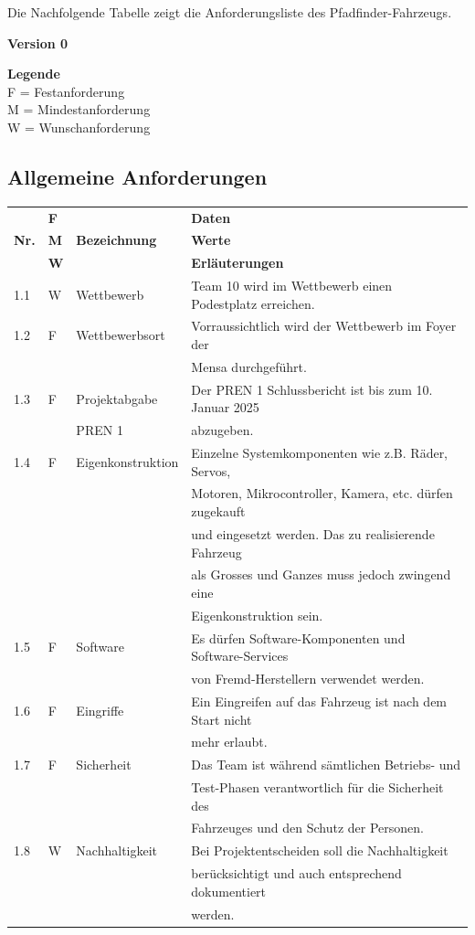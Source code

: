 \documentclass[../main.tex]{subfiles}
\begin{document}
Die Nachfolgende Tabelle zeigt die Anforderungsliste des Pfadfinder-Fahrzeugs.

\textbf{Version 0}

\textbf{Legende} \\ F = Festanforderung \\ M = Mindestanforderung \\ W = Wunschanforderung

\subsection{Allgemeine Anforderungen}
\begin{tabular}{|l|l|l|l|}
  \hline
  & \textbf{F} & & \textbf{Daten} \\
  \textbf{Nr.} & \textbf{M} & \textbf{Bezeichnung} & \textbf{Werte} \\
  & \textbf{W} & & \textbf{Erläuterungen} \\
  \hline
  1.1 & W & Wettbewerb & Team 10 wird im Wettbewerb einen Podestplatz
  erreichen. \\
  \hline
  1.2 & F & Wettbewerbsort & Vorraussichtlich wird der Wettbewerb im
  Foyer der \\
  & & & Mensa durchgeführt. \\
  \hline
  1.3 & F & Projektabgabe & Der PREN 1 Schlussbericht ist bis zum 10.
  Januar 2025 \\
  & & PREN 1 & abzugeben. \\
  \hline
  1.4 & F & Eigenkonstruktion & Einzelne Systemkomponenten wie z.B.
  Räder, Servos, \\
  & & & Motoren, Mikrocontroller, Kamera, etc. dürfen zugekauft \\
  & & & und eingesetzt werden. Das zu realisierende Fahrzeug \\
  & & & als Grosses und Ganzes muss jedoch zwingend eine \\
  & & & Eigenkonstruktion sein. \\
  \hline
  1.5 & F & Software & Es dürfen Software-Komponenten und Software-Services \\
  & & & von Fremd-Herstellern verwendet werden. \\
  \hline
  1.6 & F & Eingriffe & Ein Eingreifen auf das Fahrzeug ist nach dem
  Start nicht \\
  & & & mehr erlaubt. \\
  \hline
  1.7 & F & Sicherheit & Das Team ist während sämtlichen Betriebs- und \\
  & & & Test-Phasen verantwortlich für die Sicherheit des \\
  & & & Fahrzeuges und den Schutz der Personen. \\
  \hline
  1.8 & W & Nachhaltigkeit & Bei Projektentscheiden soll die Nachhaltigkeit \\
  & & & berücksichtigt und auch entsprechend dokumentiert \\
  & & & werden. \\
  \hline
\end{tabular}
\end{document}
